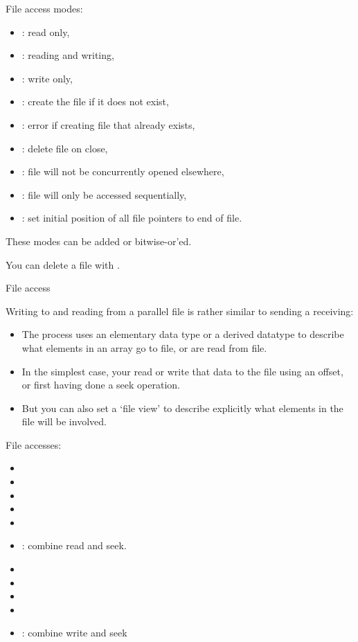 File access modes:
\begin{itemize}
\item  {}: read only,
\item  {}: reading and writing,
\item  {}: write only,
\item  {}: create the file if it does not exist,
\item  {}: error if creating file that already exists,
\item  {}: delete file on close,
\item  {}: file will not be concurrently opened
  elsewhere,
\item  {}: file will only be accessed sequentially,
\item  {}: set initial position of all file pointers to end
  of file.
\end{itemize}
These modes can be added or bitwise-or'ed.

You can delete a file with .

 {File access}

Writing to and reading from a parallel file is rather similar to
sending a receiving:
\begin{itemize}
\item The process uses an elementary data type or a derived datatype
  to describe what elements in an array go to file, or are read from
  file.
\item In the simplest case, your read or write that data to the file using an
  offset, or first having done a seek operation.
\item But you can also set a `file view' to describe explicitly what
  elements in the file will be involved.
\end{itemize}

File accesses:
\begin{itemize}
\item {}
\item {}
\item {}
\item {}
\item {}
\item {}: combine read and seek.
\item {}
\item {}
\item {}
\item {}
\item {}: combine write and seek
\end{itemize}

